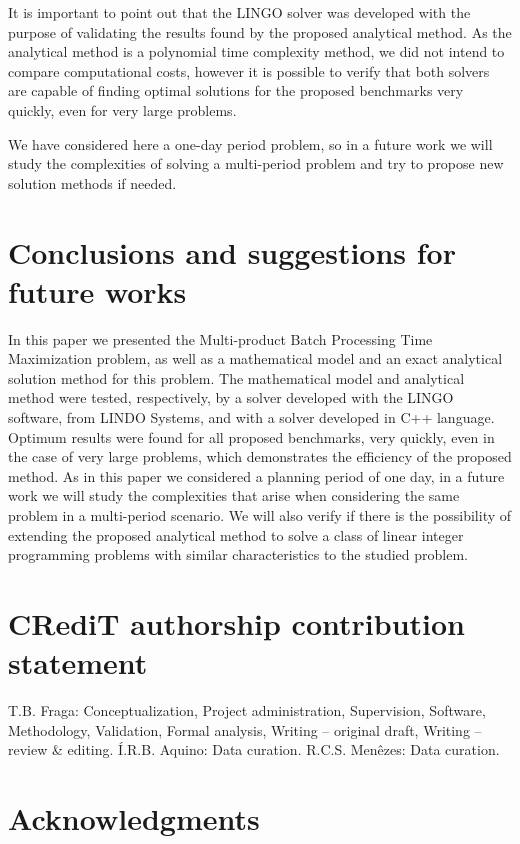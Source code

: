 \documentclass[authoryear,manuscript,12pt]{elsarticle}
\begin{document}
It is important to point out that the LINGO solver was developed with the purpose of validating the results found by the proposed analytical method. As the analytical method is a polynomial time complexity method, we did not intend to compare computational costs, however it is possible to verify that both solvers are capable of finding optimal solutions for the proposed benchmarks very quickly, even for very large problems.

We have considered here a one-day period problem, so in a future work we will study the complexities of solving a multi-period problem and try to propose new solution methods if needed. 

\section{Conclusions and suggestions for future works}
\label{sec:conclusions}

In this paper we presented the Multi-product Batch Processing Time Maximization problem, as well as a mathematical model and an exact analytical solution method for this problem. The mathematical model and analytical method were tested, respectively, by a solver developed with the LINGO software, from LINDO Systems, and with a solver developed in C++ language. Optimum results were found for all proposed benchmarks, very quickly, even in the case of very large problems, which demonstrates the efficiency of the proposed method. As in this paper we considered a planning period of one day, in a future work we will study the complexities that arise when considering the same problem in a multi-period scenario. We will also verify if there is the possibility of extending the proposed analytical method to solve a class of linear integer programming problems with similar characteristics to the studied problem.

\section{CRediT authorship contribution statement} 
\label{sec:contributions}

T.B. Fraga: Conceptualization, Project administration, Supervision, Software, Methodology, Validation, Formal analysis, Writing – original draft, Writing – review \& editing. Í.R.B. Aquino: Data curation. R.C.S. Menêzes: Data curation.

\section{Acknowledgments}
\label{sec:acknowledgments}
\end{document}
